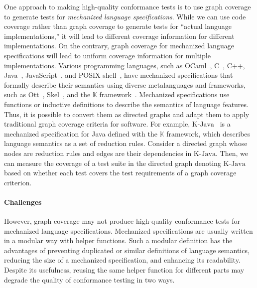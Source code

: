 \documentclass[acmsmall,review,screen]{acmart}
\newcommand{\kjava}{\text{K-Java}}
\newcommand{\kframework}{\mathbb{K}}
\begin{document}

One approach to making high-quality conformance tests is to use graph coverage
to generate tests for \textit{mechanized language specifications}.
%
While we can use code coverage rather than graph coverage
to generate tests for ``actual language implementations,''
it will lead to different coverage information for different implementations.
On the contrary, graph coverage for mechanized language specifications
will lead to uniform coverage information for multiple implementations.
%
Various programming languages, such as OCaml~\cite{ocaml-light-spec},
C~\cite{c-light-spec}, C++\cite{cpp-spec}, Java~\cite{k-java},
JavaScript~\cite{jiset}, and POSIX shell~\cite{posix-shell-spec},
have mechanized specifications that formally describe their
semantics using diverse metalanguages and frameworks, such as Ott~\cite{ott}, Skel~\cite{skel}, and the
$\kframework$ framework~\cite{kframework}.
%
Mechanized specifications use functions or inductive definitions to describe the
semantics of language features. Thus, it is possible to convert them as directed
graphs and adapt them to apply traditional graph coverage criteria for software.
For example, $\kjava$~\cite{k-java} is a mechanized specification for Java
defined with the $\kframework$ framework, which describes language semantics
as a set of reduction rules.
Consider a directed graph whose nodes are reduction rules and edges are
their dependencies in $\kjava$.
Then, we can measure the coverage of a test suite in the directed graph denoting $\kjava$
based on whether each test covers the test requirements of a graph coverage criterion.


\paragraph{\textbf{Challenges}}
However, graph coverage may not produce high-quality conformance tests
for mechanized language specifications.
Mechanized specifications are usually written in a modular way with helper functions.
Such a modular definition has the advantages of preventing duplicated or similar
definitions of language semantics, reducing the size of a mechanized
specification, and enhancing its readability.
Despite its usefulness, reusing the same helper function for different parts
may degrade the quality of conformance testing in two ways.

\end{document}
